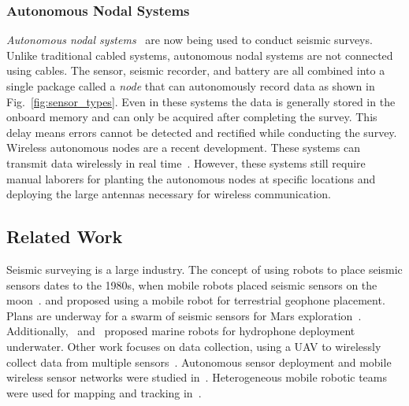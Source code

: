  \subsubsection{Autonomous Nodal Systems}
  \emph{Autonomous nodal systems}~\cite{wood1998distributed} are now being used to conduct seismic surveys. Unlike traditional cabled systems, autonomous nodal systems are not connected using cables. The sensor, seismic recorder, and battery are all combined into a single package called a \emph{node} that can autonomously record data as shown in Fig.~\ref{fig:sensor_types}. Even in these systems the data is generally stored in the onboard memory and can only be acquired after completing the survey. This delay means errors cannot be detected and rectified while conducting the survey. 
  Wireless autonomous nodes are a recent development. These systems can transmit data wirelessly in real time~\cite{jiang2015geophysical}. However, these systems still require manual laborers for planting the autonomous nodes at specific locations and deploying the large antennas necessary for wireless communication.
 
\subsection{Related Work}

Seismic surveying is a large industry.
The concept of using robots to place seismic sensors dates to the 1980s, when mobile robots placed seismic sensors on the moon~\cite{LSisMSE81}. \cite{DSSMaA14} and \cite{coste2013seismic} proposed using a mobile robot for terrestrial geophone placement. Plans are underway for a swarm of seismic sensors for Mars exploration~\cite{MAPL2006}.
Additionally,~\cite{muyzert2015marine} and~\cite{postel2014drone} proposed marine robots for hydrophone deployment underwater. 
Other work  focuses on data collection, using a UAV to wirelessly collect data from multiple sensors~\cite{wilcox2013seismic}. Autonomous sensor deployment and mobile wireless sensor networks were studied in~\cite{howard2002mobile,corke2004autonomous,tuna2014autonomous}. Heterogeneous mobile robotic teams were used for mapping and tracking in~\cite{howard2006experiments}.

